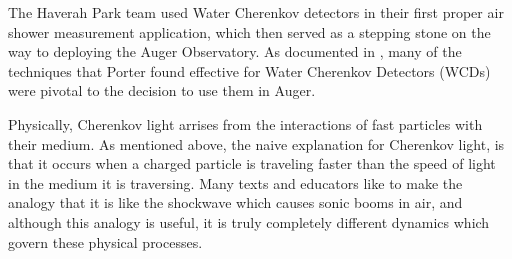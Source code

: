 The Haverah Park team used Water Cherenkov detectors in their first proper air shower measurement application, which then served as a stepping stone on the way to deploying the Auger Observatory. As documented in , many of the techniques that Porter found effective for Water Cherenkov Detectors (WCDs) were pivotal to the decision to use them in Auger.

Physically, Cherenkov light arrises from the interactions of fast particles with their medium. As mentioned above, the naive explanation for Cherenkov light, is that it occurs when a charged particle is traveling faster than the speed of light in the medium it is traversing. Many texts and educators like to make the analogy that it is like the shockwave which causes sonic booms in air, and although this analogy is useful, it is truly completely different dynamics which govern these physical processes. 

